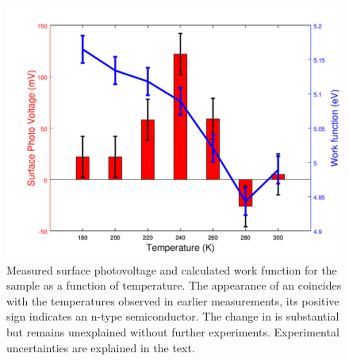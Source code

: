 \begin{figure}
\centering
	\includegraphics[width=0.8\linewidth]{./figs/chap2/vox3}
	\caption{Measured surface photovoltage and calculated work function for the \wvadiox{} sample as a function of temperature. The appearance of an \spv{} coincides with the \mit{} temperatures observed in earlier measurements, its positive sign indicates an n-type semiconductor. The change in \wf{} is substantial but remains unexplained without further experiments. Experimental uncertainties are explained in the text.}
	\label{fig:vox3}
\end{figure}
